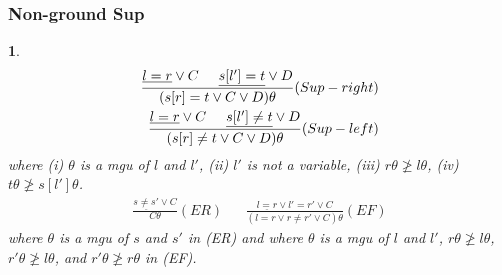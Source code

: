 \documentclass[]{article}
\newtheorem*{blue}{}
\begin{document}
\begin{multicols}{3}
\begin{minipage}[t]{.31\textwidth}
\subsubsection*{Non-ground Sup}
\begin{blue}
\begin{align*}
	\frac{\underline{l=r} \lor C \hspace{.5cm} \underline{s[l']=t} \lor D}{(s[r]=t \lor C \lor D)\theta} (Sup-right)\\
	\frac{\underline{l=r} \lor C \hspace{.5cm} \underline{s[l']\not=t} \lor D}{(s[r]\not=t \lor C \lor D)\theta} (Sup-left)\\
\end{align*}
where (i) $\theta$ is a mgu of $l$ and $l'$, (ii) $l'$ is not a variable, (iii) $r\theta \not\geq l\theta$, (iv) $t\theta\not\geq s[l']\theta$.
\begin{align*}
	\frac{\underline{s\not= s'} \lor C}{C\theta} (ER) && \frac{\underline{l=r} \lor l'=r' \lor C}{(l=r \lor r\not= r' \lor C)\theta} (EF)
\end{align*}
where $\theta$ is a mgu of $s$ and $s'$ in (ER) and where $\theta$ is a mgu of $l$ and $l'$, $r\theta \not\geq l\theta$, $r'\theta \not\geq l\theta$, and $r'\theta \not\geq r\theta$ in (EF).
\end{blue}

\end{minipage}


\end{multicols}
\end{document}
